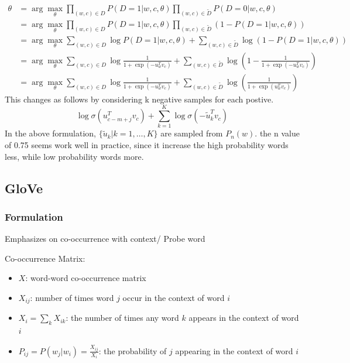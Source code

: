 \documentclass[12pt]{article}
\begin{document}
        \begin{align*}
            \theta &= \arg\max_{\theta} \prod_{(w,c) \in D} P(D = 1|w, c, \theta) \prod_{(w,c) \in \tilde{D}} P(D = 0|w, c, \theta) \\
            &= \arg\max_{\theta} \prod_{(w,c) \in D} P(D = 1|w, c, \theta) \prod_{(w,c) \in \tilde{D}} (1 - P(D = 1|w, c, \theta)) \\
            &= \arg\max_{\theta} \sum_{(w,c) \in D} \log P(D = 1|w, c, \theta) + \sum_{(w,c) \in \tilde{D}} \log(1 - P(D = 1|w, c, \theta)) \\
            &= \arg\max_{\theta} \sum_{(w,c) \in D} \log \frac{1}{1 + \exp(-u_w^T v_c)} + \sum_{(w,c) \in \tilde{D}} \log\left(1 - \frac{1}{1 + \exp(-u_w^T v_c)}\right) \\
            &= \arg\max_{\theta} \sum_{(w,c) \in D} \log \frac{1}{1 + \exp(-u_w^T v_c)} + \sum_{(w,c) \in \tilde{D}} \log\left(\frac{1}{1 + \exp(u_w^T v_c)}\right)
        \end{align*}
        This changes as follows by considering k negative samples for each postive.
        \[
            \log \sigma(u_{c-m+j}^T v_c) + \sum_{k=1}^{K} \log \sigma(-\tilde{u}_k^T v_c)
        \]
        In the above formulation, $\{\tilde{u}_k | k = 1, \ldots, K\}$ are sampled from $P_n(w)$.
        the n value of 0.75 seems work well in practice, since it increase the high probability words 
        less, while low probability words more.

    \subsection{GloVe}
        \subsubsection{Formulation}
            Emphasizes on co-occurrence with context/ Probe word 
            \begin{mdframed}
                Co-occurrence Matrix:
                \begin{itemize}
                    \item $X$: word-word co-occurrence matrix
                    \item $X_{ij}$: number of times word $j$ occur in the context of word $i$
                    \item $X_i = \sum_k X_{ik}$: the number of times any word $k$ appears in the context of word $i$
                    \item $P_{ij} = P(w_j | w_i) = \frac{X_{ij}}{X_i}$: the probability of $j$ appearing in the context of word $i$
                \end{itemize}
            \end{mdframed}
\end{document}
